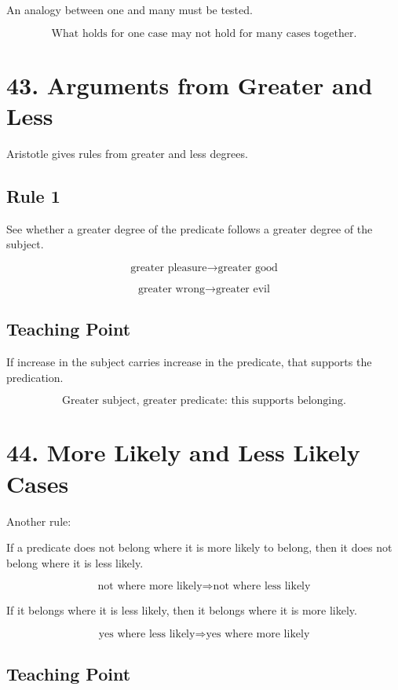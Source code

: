 \documentclass[12pt]{article}
\begin{document}
An analogy between one and many must be tested.

\[
\boxed{
\text{What holds for one case may not hold for many cases together.}
}
\]

\section*{43. Arguments from Greater and Less}

Aristotle gives rules from greater and less degrees.

\subsection*{Rule 1}

See whether a greater degree of the predicate follows a greater degree of the
subject.

\[
\text{greater pleasure} \rightarrow \text{greater good}
\]

\[
\text{greater wrong} \rightarrow \text{greater evil}
\]

\subsection*{Teaching Point}

If increase in the subject carries increase in the predicate, that supports the
predication.

\[
\boxed{
\text{Greater subject, greater predicate: this supports belonging.}
}
\]

\section*{44. More Likely and Less Likely Cases}

Another rule:

If a predicate does not belong where it is more likely to belong, then it does
not belong where it is less likely.

\[
\text{not where more likely}
\Rightarrow
\text{not where less likely}
\]

If it belongs where it is less likely, then it belongs where it is more likely.

\[
\text{yes where less likely}
\Rightarrow
\text{yes where more likely}
\]

\subsection*{Teaching Point}
\end{document}
